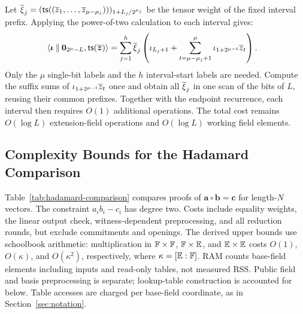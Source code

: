 Let
\(\overline{\xi}_j=
({\sf ts}((\overline{z}_1,\ldots,\overline{z}_{\mu-\mu_j})))_{1+L_j/2^{\mu_j}}\)
be the tensor weight of the fixed interval prefix.
Applying the power-of-two calculation to each interval gives:
\[
\begin{aligned}
    &\left\langle
       \bm\iota\mathbin{\|}\bm0_{2^\mu-L},
       {\sf ts}(\overline{\bm z})
     \right\rangle
     =
       \sum_{j=1}^h\overline{\xi}_j
       \left(
          \iota_{L_j+1}
          +\sum_{t=\mu-\mu_j+1}^{\mu}
             \iota_{1+2^{\mu-t}}\overline{z}_t
       \right).
\end{aligned}
\]
Only the \(\mu\) single-bit labels and the \(h\)
interval-start labels are needed.
Compute the suffix sums of
\(\iota_{1+2^{\mu-t}}\overline{z}_t\) once and obtain all
\(\overline{\xi}_j\) in one scan of the bits of \(L\), reusing
their common prefixes.
Together with the endpoint recurrence, each interval then
requires \(O(1)\) additional operations.
The total cost remains \(O(\log L)\) extension-field
operations and \(O(\log L)\) working field elements.

\clearpage

\iffalse
\subsection{Complexity Bounds for the Hadamard Comparison}
\label{appx:hadamard-comparison}

Table~\ref{tab:hadamard-comparison} compares proofs of
\(\bm a\circ\bm b=\bm c\) for length-\(N\) vectors.
The constraint \(a_i b_i-c_i\) has degree two. Costs include equality
weights, the linear output check, witness-dependent preprocessing, and all reduction
rounds, but exclude commitments and openings. The derived upper bounds
use schoolbook arithmetic: multiplication in
\({\mathbb{F}}\times{\mathbb{F}}\), \({\mathbb{F}}\times\mathbb{E}\), and
\(\mathbb{E}\times\mathbb{E}\) costs \(O(1)\),
\(O(\kappa)\), and \(O(\kappa^2)\), respectively, where
\(\kappa=[\mathbb{E}:{\mathbb{F}}]\). RAM counts base-field elements
including inputs and read-only tables, not measured RSS.
Public field and basis preprocessing is separate; lookup-table
construction is accounted for below. Table accesses are charged
per base-field coordinate, as in Section~\ref{sec:notation}.

